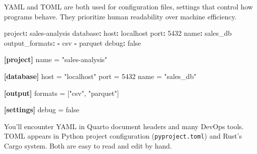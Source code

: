 \documentclass[
  letterpaper,
  DIV=11,
  numbers=noendperiod]{scrreprt}
\newenvironment{Shaded}{\begin{snugshade}}{\end{snugshade}}
\newcommand{\AttributeTok}[1]{\textcolor[rgb]{0.40,0.45,0.13}{#1}}
\newcommand{\CharTok}[1]{\textcolor[rgb]{0.13,0.47,0.30}{#1}}
\newcommand{\ConstantTok}[1]{\textcolor[rgb]{0.56,0.35,0.01}{#1}}
\newcommand{\DataTypeTok}[1]{\textcolor[rgb]{0.68,0.00,0.00}{#1}}
\newcommand{\DecValTok}[1]{\textcolor[rgb]{0.68,0.00,0.00}{#1}}
\newcommand{\FunctionTok}[1]{\textcolor[rgb]{0.28,0.35,0.67}{#1}}
\newcommand{\KeywordTok}[1]{\textcolor[rgb]{0.00,0.23,0.31}{\textbf{#1}}}
\newcommand{\OperatorTok}[1]{\textcolor[rgb]{0.37,0.37,0.37}{#1}}
\newcommand{\StringTok}[1]{\textcolor[rgb]{0.13,0.47,0.30}{#1}}
\begin{document}
YAML and TOML are both used for configuration files, settings that
control how programs behave. They prioritize human readability over
machine efficiency.

\begin{codelisting}

\caption{\texttt{config.yaml}}

\begin{Shaded}
\begin{Highlighting}[]
\FunctionTok{project}\KeywordTok{:}\AttributeTok{ sales{-}analysis}
\FunctionTok{database}\KeywordTok{:}
\AttributeTok{  }\FunctionTok{host}\KeywordTok{:}\AttributeTok{ localhost}
\AttributeTok{  }\FunctionTok{port}\KeywordTok{:}\AttributeTok{ }\DecValTok{5432}
\AttributeTok{  }\FunctionTok{name}\KeywordTok{:}\AttributeTok{ sales\_db}
\FunctionTok{output\_formats}\KeywordTok{:}
\AttributeTok{  }\KeywordTok{{-}}\AttributeTok{ csv}
\AttributeTok{  }\KeywordTok{{-}}\AttributeTok{ parquet}
\FunctionTok{debug}\KeywordTok{:}\AttributeTok{ }\CharTok{false}
\end{Highlighting}
\end{Shaded}

\end{codelisting}

\begin{codelisting}

\caption{\texttt{config.toml}}

\begin{Shaded}
\begin{Highlighting}[]
\KeywordTok{[project]}
\DataTypeTok{name} \OperatorTok{=} \StringTok{"sales{-}analysis"}

\KeywordTok{[database]}
\DataTypeTok{host} \OperatorTok{=} \StringTok{"localhost"}
\DataTypeTok{port} \OperatorTok{=} \DecValTok{5432}
\DataTypeTok{name} \OperatorTok{=} \StringTok{"sales\_db"}

\KeywordTok{[output]}
\DataTypeTok{formats} \OperatorTok{=} \OperatorTok{[}\StringTok{"csv"}\OperatorTok{,} \StringTok{"parquet"}\OperatorTok{]}

\KeywordTok{[settings]}
\DataTypeTok{debug} \OperatorTok{=} \ConstantTok{false}
\end{Highlighting}
\end{Shaded}

\end{codelisting}

You'll encounter YAML in Quarto document headers and many DevOps tools.
TOML appears in Python project configuration (\texttt{pyproject.toml})
and Rust's Cargo system. Both are easy to read and edit by hand.
\end{document}
